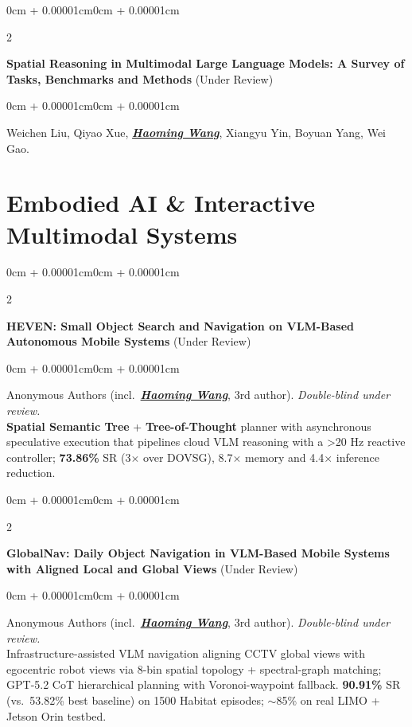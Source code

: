\documentclass[10pt, letterpaper]{article}
\newenvironment{onecolentry}{
    \begin{adjustwidth}{0cm + 0.00001cm}{0cm + 0.00001cm}
}{\end{adjustwidth}}
\newenvironment{twocolentry}[2][]{
    \onecolentry
    \def\secondColumn{#2}
    \setcolumnwidth{\fill, 4.5cm}
    \begin{paracol}{2}
}{\switchcolumn \raggedleft \secondColumn \end{paracol} \endonecolentry}
\begin{document}
\vspace{0.18cm}

\begin{twocolentry}{2026 (Under Review)}
    \textbf{Spatial Reasoning in Multimodal Large Language Models: A Survey of Tasks, Benchmarks and Methods}
\end{twocolentry}
\vspace{0.04cm}
\begin{onecolentry}
Weichen Liu, Qiyao Xue, \underline{\textbf{\textit{Haoming Wang}}}, Xiangyu Yin, Boyuan Yang, Wei Gao.
\end{onecolentry}

\section{Embodied AI \& Interactive Multimodal Systems}

\begin{twocolentry}{2026 (Under Review)}
    \textbf{HEVEN: Small Object Search and Navigation on VLM-Based Autonomous Mobile Systems}
\end{twocolentry}
\vspace{0.04cm}
\begin{onecolentry}
Anonymous Authors (incl.\ \underline{\textbf{\textit{Haoming Wang}}}, 3rd author). \textit{Double-blind under review.} \\
{\small \textbf{Spatial Semantic Tree} + \textbf{Tree-of-Thought} planner with asynchronous speculative execution that pipelines cloud VLM reasoning with a >20 Hz reactive controller; \textbf{73.86\%} SR (3$\times$ over DOVSG), 8.7$\times$ memory and 4.4$\times$ inference reduction.}
\end{onecolentry}

\vspace{0.18cm}

\begin{twocolentry}{2026 (Under Review)}
    \textbf{GlobalNav: Daily Object Navigation in VLM-Based Mobile Systems with Aligned Local and Global Views}
\end{twocolentry}
\vspace{0.04cm}
\begin{onecolentry}
Anonymous Authors (incl.\ \underline{\textbf{\textit{Haoming Wang}}}, 3rd author). \textit{Double-blind under review.} \\
{\small Infrastructure-assisted VLM navigation aligning CCTV global views with egocentric robot views via 8-bin spatial topology + spectral-graph matching; GPT-5.2 CoT hierarchical planning with Voronoi-waypoint fallback. \textbf{90.91\%} SR (vs.\ 53.82\% best baseline) on 1500 Habitat episodes; $\sim$85\% on real LIMO + Jetson Orin testbed.}
\end{onecolentry}
\end{document}
